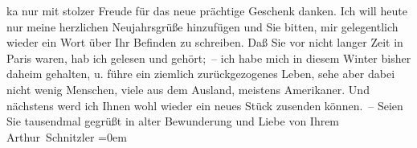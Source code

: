 \begin{ledgroupsized}[t]{13cm}
                    ka{\geminationn} nur mit stolzer Freude für das neue prächtige Geschenk danken. Ich will
                    heute nur meine herzlichen Neujahrsgrüße hinzufügen und Sie bitten, mir
                    gelegentlich wieder ein Wort über Ihr Befinden zu schreiben. Daß Sie vor nicht
                    langer Zeit in Paris waren, hab ich gelesen und
                    gehört; – ich habe mich in diesem Winter bisher daheim gehalten, u. {\pb}führe ein ziemlich zurückgezogenes Leben,
                    sehe aber dabei nicht wenig Menschen, viele aus dem Ausland, meistens Amerikaner. Und nächstens werd ich Ihnen wohl
                    wieder ein neues Stück zusenden können. –\pend
           \pstart
           Seien Sie tausendmal gegrüßt in alter Bewunderung und Liebe von Ihrem{\\[\baselineskip]}\spacefill\mbox{Arthur Schnitzler}\pend
           \leftskip=0em{}
         
         \endnumbering{}\end{ledgroupsized}  \newcommand{\dateiname}{L02407}\newcommand{\titel}{Arthur Schnitzler an Georg Brandes, 4. 1. 1924}\newcommand{\editorInnen}{Martin Anton Müller und Gerd-Hermann Susen}
      